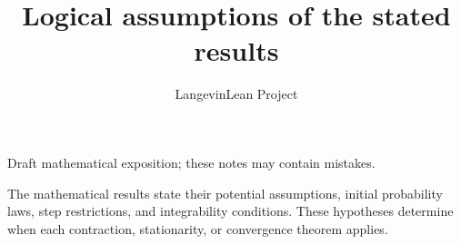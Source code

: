 \documentclass[11pt,a4paper]{article}
\title{\texorpdfstring{Logical assumptions of the stated results}{Logical assumptions of the stated results}}
\author{LangevinLean Project}
\date{}
\begin{document}
\maketitle
Draft mathematical exposition; these notes may contain mistakes.


The mathematical results state their potential assumptions, initial probability laws, step restrictions, and integrability conditions. These hypotheses determine when each contraction, stationarity, or convergence theorem applies.
\end{document}
